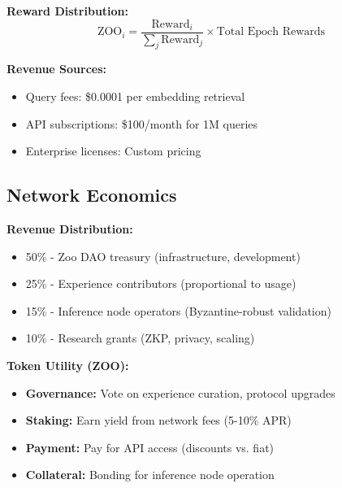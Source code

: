 \textbf{Reward Distribution:}
\begin{equation}
\text{ZOO}_i = \frac{\text{Reward}_i}{\sum_j \text{Reward}_j} \times \text{Total Epoch Rewards}
\end{equation}

\textbf{Revenue Sources:}
\begin{itemize}
\item Query fees: \$0.0001 per embedding retrieval
\item API subscriptions: \$100/month for 1M queries
\item Enterprise licenses: Custom pricing
\end{itemize}

\subsection{Network Economics}

\textbf{Revenue Distribution:}
\begin{itemize}
\item 50\% - Zoo DAO treasury (infrastructure, development)
\item 25\% - Experience contributors (proportional to usage)
\item 15\% - Inference node operators (Byzantine-robust validation)
\item 10\% - Research grants (ZKP, privacy, scaling)
\end{itemize}

\textbf{Token Utility (ZOO):}
\begin{itemize}
\item \textbf{Governance:} Vote on experience curation, protocol upgrades
\item \textbf{Staking:} Earn yield from network fees (5-10\% APR)
\item \textbf{Payment:} Pay for API access (discounts vs. fiat)
\item \textbf{Collateral:} Bonding for inference node operation
\end{itemize}

